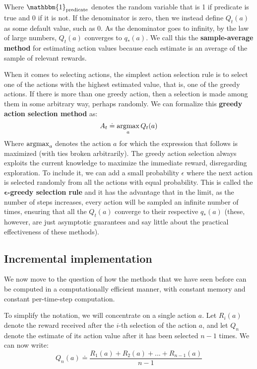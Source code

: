 Where $\mathbbm{1}_{\text{predicate}}$ denotes the random variable that is 1 if predicate is true and 0 if it is not. If the denominator is zero, then we instead define $Q_t(a)$  as some default value, such as 0. As the denominator goes to infinity, by the law of large numbers, $Q_t(a)$ converges to $q_*(a)$. We call this the \textbf{sample-average method} for estimating action values because each estimate is an average of the sample of relevant rewards.

When it comes to selecting actions, the simplest action selection rule is to select one of the actions with the highest estimated value, that is, one of the greedy actions. If there is more than one greedy action, then a selection is made among them in some arbitrary way, perhaps randomly. We can formalize this \textbf{greedy action selection method} as:
\begin{equation}
    A_t \doteq \operatorname*{argmax}_a  Q_t(a)
    \label{eq:ch3-greedyactionselectionmethod}
\end{equation}
Where $\operatorname*{argmax}_a$ denotes the action $a$ for which the expression that follows is maximized (with ties broken arbitrarily). The greedy action selection always exploits the current knowledge to maximize the immediate reward, disregarding exploration. To include it, we can add a small probability $\epsilon$ where the next action is selected randomly from all the actions with equal probability. This is called the \textbf{$\boldsymbol{\epsilon}$-greedy selection rule} and it has the advantage that in the limit, as the number of steps increases, every action will be sampled an infinite number of times, ensuring that all the $Q_t(a)$ converge to their respective $q_*(a)$ (these, however, are just asymptotic guarantees and say little about the practical effectiveness of these methods).

\subsection{Incremental implementation}
We now move to the question of how the methods that we have seen before can be computed in a computationally efficient manner, with constant memory and constant per-time-step computation.

To simplify the notation, we will concentrate on a single action $a$. Let $R_i(a)$ denote the reward received after the $i$-th selection of the action $a$, and let $Q_n$ denote the estimate of its action value after it has been selected $n-1$ times. We can now write:
\begin{equation*}
    Q_n(a) \doteq \frac{R_1(a) + R_2(a) + ... + R_{n-1}(a)}{n-1}
\end{equation*}

